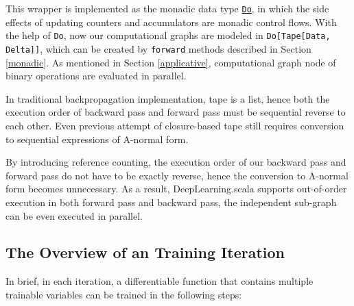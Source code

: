 This wrapper is implemented as the monadic data type \href{https://javadoc.io/page/com.thoughtworks.raii/asynchronous_2.11/latest/com/thoughtworks/raii/asynchronous%24%24Do.html}{\lstinline{Do}}, in which the side effects of updating counters and accumulators are monadic control flows. With the help of \lstinline{Do}, now our computational graphs are modeled in \lstinline{Do[Tape[Data, Delta]]}, which can be created by \lstinline{forward} methods described in Section \ref{monadic}. As mentioned in Section \ref{applicative}, \gls{computational graph} node of binary operations are evaluated in parallel.

In traditional backpropagation implementation, tape is a list, hence both the execution order of backward pass and forward pass must be sequential reverse to each other. Even previous attempt of closure-based tape\cite{pearlmutter2008reverse} still requires conversion to sequential expressions of A-normal form\cite{sabry1993reasoning}. 

By introducing reference counting, the execution order of our backward pass and forward pass do not have to be exactly reverse, hence the conversion to A-normal form becomes unnecessary. As a result, DeepLearning.scala supports out-of-order execution in both forward pass and backward pass, the independent sub-graph can be even executed in parallel.

\subsection{The Overview of an Training Iteration}
\label{training iteration}

In brief, in each iteration, a \gls{differentiable function} that contains multiple \glspl{trainable variable} can be trained in the following steps:

